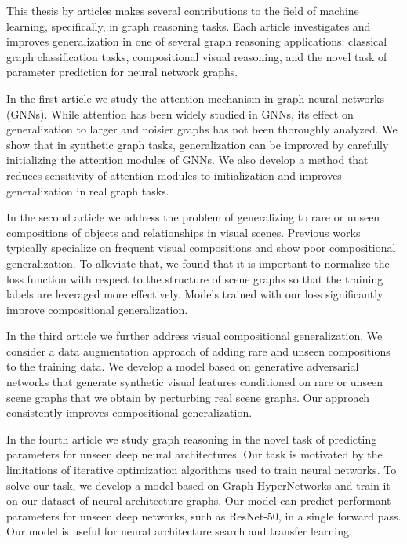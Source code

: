 

\noindent This thesis by articles makes several contributions to the field of machine learning, specifically, in graph reasoning tasks. Each article investigates and improves generalization in one of several graph reasoning applications: classical graph classification tasks, compositional visual reasoning, and the novel task of parameter prediction for neural network graphs.

In the first article we study the attention mechanism in graph neural networks (GNNs). While attention has been widely studied in GNNs, its effect on generalization to larger and noisier graphs has not been thoroughly analyzed. 
We show that in synthetic graph tasks, generalization can be improved by carefully initializing the attention modules of GNNs.
We also develop a method that reduces sensitivity of attention modules to initialization and improves generalization in real graph tasks.

In the second article we address the problem of generalizing to rare or unseen compositions of objects and relationships in visual scenes. 
Previous works typically specialize on frequent visual compositions and show poor compositional generalization. To alleviate that, we found that it is important to normalize the loss function with respect to the structure of scene graphs so that the training labels are leveraged more effectively. Models trained with our loss significantly improve compositional generalization.

In the third article we further address visual compositional generalization. We consider a data augmentation approach of adding rare and unseen compositions to the training data. We develop a model based on generative adversarial networks that generate synthetic visual features conditioned on rare or unseen scene graphs that we obtain by perturbing real scene graphs. Our approach consistently improves compositional generalization.

In the fourth article we study graph reasoning in the novel task of predicting parameters for unseen deep neural architectures. Our task is motivated by the limitations of iterative optimization algorithms used to train neural networks.
To solve our task, we develop a model based on Graph HyperNetworks and train it on our dataset of neural architecture graphs. Our model can predict performant parameters for unseen deep networks, such as ResNet-50, in a single forward pass.
Our model is useful for neural architecture search and transfer learning.
